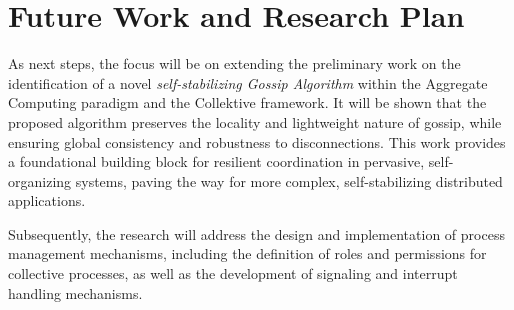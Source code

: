 \documentclass[runningheads]{llncs}
\begin{document}
    \section{Future Work and Research Plan}\label{sec:future}

    As next steps,
    the focus will be on extending the preliminary work on the identification of a novel \emph{self-stabilizing Gossip Algorithm}
    within the Aggregate Computing paradigm and the Collektive framework.
%
    It will be shown that the proposed algorithm preserves the locality and lightweight nature of gossip,
    while ensuring global consistency and robustness to disconnections.
%
    This work provides a foundational building block for resilient coordination in pervasive,
    self-organizing systems, paving the way for more complex, self-stabilizing distributed applications.

    Subsequently,
    the research will address the design and implementation of process management mechanisms,
    including the definition of roles and permissions for collective processes,
    as well as the development of signaling and interrupt handling mechanisms.
\end{document}
